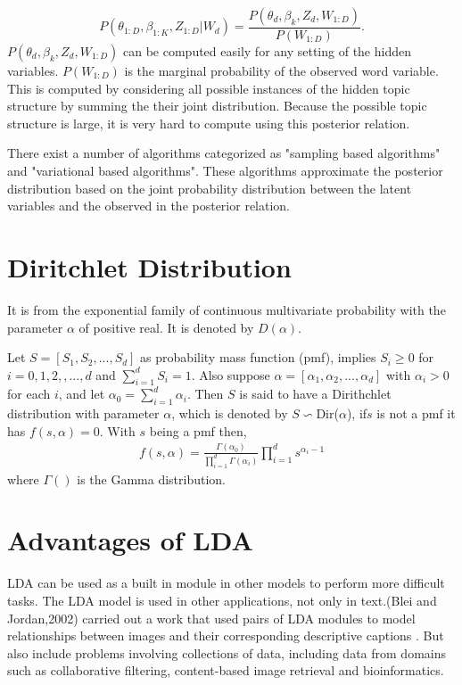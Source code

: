 $$P(\theta_{1:D},\beta_{1:K},Z_{1:D}|W_d)=\frac{P(\theta_d,\beta_k,Z_d,W_{1:D})}{P(W_{1:D})}\text{.}$$
$P(\theta_d,\beta_k,Z_d,W_{1:D})$ can be computed easily for any setting of the hidden variables. $P(W_{1:D})$ is the marginal probability of the observed word variable. This is computed by considering all possible instances of the hidden topic structure by summing the their joint distribution. Because the possible topic structure is large, it is very hard to compute using this posterior relation.

There exist a number of algorithms categorized as "sampling based algorithms" and "variational based algorithms". These algorithms approximate the posterior distribution based on the joint probability distribution between the latent variables and the observed in the posterior relation.


\section{Diritchlet Distribution}
It is from the exponential family of continuous multivariate probability with the parameter $\alpha$ of positive real. It is denoted by $D(\alpha)$.

Let $S=[S_1,S_2,...,S_d] $ as probability mass function (pmf), implies $S_i\geq 0$ for $i=0,1,2,,...,d$ and $\sum _{i=1}^{d}S_i=1$. Also suppose $\alpha=[\alpha_1,\alpha_2,...,\alpha_d]$ with $\alpha_i>0$ for each $i$, and let $\alpha_0=\sum _{i=1}^{d}\alpha_i$. Then $S$ is said to have a Dirithchlet distribution
with parameter $\alpha$, which is denoted by $S \backsim $Dir($\alpha$), if$s$ is not a pmf  it has $f(s,\alpha)=0$. With $s$ being a  pmf then,
\begin{align}
f(s,\alpha)=\frac{\Gamma(\alpha_0)}{\prod_{i=1}^{d}\Gamma(\alpha_i)}\prod_{i=1}^{d}s^{\alpha_i -1}
\end{align}
where $\Gamma()$ is the Gamma distribution.
\section{Advantages of LDA} 
LDA can be used as a built in module in other models to perform more difficult tasks.
The LDA model is used in other applications, not only in text.(Blei and Jordan,2002) carried out a  work that used pairs of LDA modules to
model relationships between images and their corresponding descriptive captions .
But also include problems involving collections of data, including data from domains such as collaborative filtering,
content-based image retrieval and bioinformatics.
